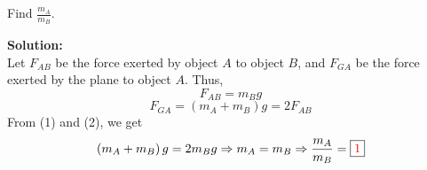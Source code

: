 \documentclass[12pt]{article}
\begin{document}
		\noindent
		Find \( \displaystyle \frac{m_A}{m_B}  \).
		
		\bigskip
		\noindent
		\textbf{Solution:} \\
		Let $F_{AB}$ be the force exerted by object $A$ to object $B$, and $F_{GA}$ be the force exerted by the plane to object $A$. Thus,
		\begin{equation}
			F_{AB} = m_Bg 	
		\end{equation}
		\begin{equation}
			F_{GA} = \left( m_A + m_B \right) g  = 2F_{AB}	
		\end{equation}
		From (1) and (2), we get
		\[ \left( m_A + m_B \right) g  = 2m_Bg \Rightarrow m_A = m_B \Rightarrow \frac{m_A}{m_B} = \fbox{\textcolor{red}{1}} \]
\end{document}
